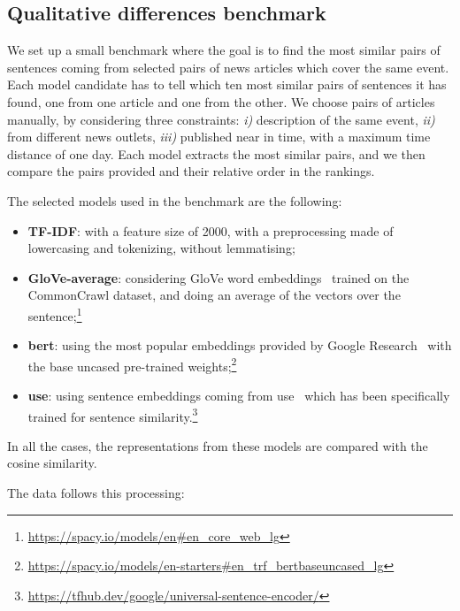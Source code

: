 \subsection{\statusgreen Qualitative differences benchmark}
\label{ssec:cgs_similarity_qualitative}
We set up a small benchmark where the goal is to find the most similar pairs of sentences coming from selected pairs of news articles which cover the same event. Each model candidate has to tell which ten most similar pairs of sentences it has found, one from one article and one from the other.
We choose pairs of articles manually, %
by considering three constraints: \textit{i)} description of the same event, \textit{ii)} from different news outlets, \textit{iii)} published near in time, with a maximum time distance of one day.
Each model extracts the most similar pairs, and we then compare the pairs provided and their relative order in the rankings.

The selected models used in the benchmark are the following:
\begin{itemize}
    \item \textbf{TF-IDF}: with a feature size of 2000, with a preprocessing made of lowercasing and tokenizing, without lemmatising;
    \item \textbf{GloVe-average}: considering GloVe word embeddings~\citep{pennington2014glove} trained on the CommonCrawl dataset, and doing an average of the vectors over the sentence;\footnote{\url{https://spacy.io/models/en\#en_core_web_lg}}
    \item \textbf{\acrshort{bert}}: using the most popular embeddings provided by Google Research~\citep{devlin2018bert} with the base uncased pre-trained weights;\footnote{\url{https://spacy.io/models/en-starters\#en_trf_bertbaseuncased_lg}}
    \item \textbf{\acrshort{use}}: using sentence embeddings coming from \acrfull{use}~\citep{cer2018universal} which has been specifically trained for sentence similarity.\footnote{\url{https://tfhub.dev/google/universal-sentence-encoder/}}
\end{itemize}

In all the cases, the representations from these models are compared with the cosine similarity.

The data follows this processing:

